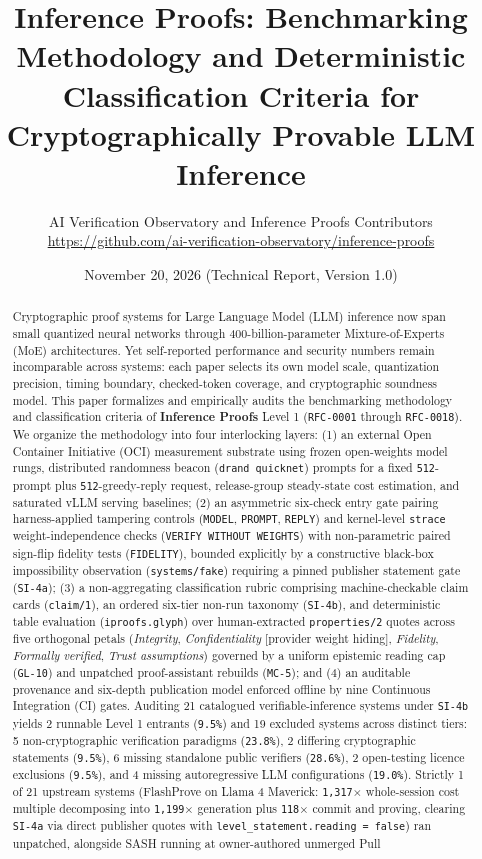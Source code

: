 \documentclass[11pt,letterpaper]{article}
\title{Inference Proofs: Benchmarking Methodology and Deterministic Classification Criteria for Cryptographically Provable LLM Inference}
\author{AI Verification Observatory and Inference Proofs Contributors\\
\small\url{https://github.com/ai-verification-observatory/inference-proofs}}
\date{November 20, 2026 \quad (Technical Report, Version 1.0)}
\begin{document}
\maketitle

\begin{abstract}
Cryptographic proof systems for Large Language Model (LLM) inference now span small quantized neural networks through 400-billion-parameter Mixture-of-Experts (MoE) architectures. Yet self-reported performance and security numbers remain incomparable across systems: each paper selects its own model scale, quantization precision, timing boundary, checked-token coverage, and cryptographic soundness model. This paper formalizes and empirically audits the benchmarking methodology and classification criteria of \textbf{Inference Proofs} Level 1 (\texttt{RFC-0001} through \texttt{RFC-0018}). We organize the methodology into four interlocking layers: (1) an external Open Container Initiative (OCI) measurement substrate using frozen open-weights model rungs, distributed randomness beacon (\texttt{drand quicknet}) prompts for a fixed \texttt{512}-prompt plus \texttt{512}-greedy-reply request, release-group steady-state cost estimation, and saturated vLLM serving baselines; (2) an asymmetric six-check entry gate pairing harness-applied tampering controls (\texttt{MODEL}, \texttt{PROMPT}, \texttt{REPLY}) and kernel-level \texttt{strace} weight-independence checks (\texttt{VERIFY WITHOUT WEIGHTS}) with non-parametric paired sign-flip fidelity tests (\texttt{FIDELITY}), bounded explicitly by a constructive black-box impossibility observation (\texttt{systems/\allowbreak{}fake}) requiring a pinned publisher statement gate (\texttt{SI-4a}); (3) a non-aggregating classification rubric comprising machine-checkable claim cards (\texttt{claim/\allowbreak{}1}), an ordered six-tier non-run taxonomy (\texttt{SI-4b}), and deterministic table evaluation (\texttt{iproofs.\allowbreak{}glyph}) over human-extracted \texttt{properties/\allowbreak{}2} quotes across five orthogonal petals (\textit{Integrity}, \textit{Confidentiality} [provider weight hiding], \textit{Fidelity}, \textit{Formally verified}, \textit{Trust assumptions}) governed by a uniform epistemic reading cap (\texttt{GL-10}) and unpatched proof-assistant rebuilds (\texttt{MC-5}); and (4) an auditable provenance and six-depth publication model enforced offline by nine Continuous Integration (CI) gates. Auditing 21 catalogued verifiable-inference systems under \texttt{SI-4b} yields 2 runnable Level 1 entrants (\texttt{9.5\%}) and 19 excluded systems across distinct tiers: 5 non-cryptographic verification paradigms (\texttt{23.8\%}), 2 differing cryptographic statements (\texttt{9.5\%}), 6 missing standalone public verifiers (\texttt{28.6\%}), 2 open-testing licence exclusions (\texttt{9.5\%}), and 4 missing autoregressive LLM configurations (\texttt{19.0\%}). Strictly 1 of 21 upstream systems (FlashProve on Llama 4 Maverick: \texttt{1,317$\times$} whole-session cost multiple decomposing into \texttt{1,199$\times$} generation plus \texttt{118$\times$} commit and proving, clearing \texttt{SI-4a} via direct publisher quotes with \texttt{level\_\allowbreak{}statement.\allowbreak{}reading = false}) ran unpatched, alongside SASH running at owner-authored unmerged Pull 
\end{abstract}
\end{document}
